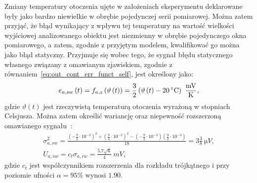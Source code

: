 Zmiany temperatury otoczenia ujęte w założeniach eksperymentu deklarowane były jako bardzo niewielkie w obrębie pojedynczej serii pomiarowej. Można zatem przyjąć, że błąd wynikający z wpływu tej temperatury na wartość wielkości wyjściowej analizowanego obiektu jest niezmienny w obrębie pojedynczego okna pomiarowego, a zatem, zgodnie z przyjętym modelem, kwalifikować go można jako błąd statyczny. Przyjmuje się wobec tego, że sygnał błędu statycznego własnego związany z omawianym zjawiskiem, zgodnie z równaniem~\eqref{eq:out_cont_err_funct_self}, jest określony jako:
\begin{equation}
e_{a,sw} \emb{t} = f_{a,z} \left( \vartheta \emb{t} \right) = \frac{3}{2} \left( \vartheta \emb{t} - \qty{20}{\degreeCelsius} \right)~\unit{\frac{mV}{K}} \label{eq:sym_parta_stat_err},
\end{equation}
gdzie $\vartheta(t)$ jest rzeczywistą temperaturą otoczenia wyrażoną w stopniach Celsjusza. Można zatem określić wariancję oraz niepewność rozszerzoną omawianego sygnału~\cite{jcgm_guide}:
\begin{gather}
\sigma_{a,sw}^{2} = \frac{\left( -\frac{9}{2} \cdot 10^{-3} \right)^{2} + \left( \frac{9}{2} \cdot 10^{-3} \right)^{2} - \left( -\frac{9}{2} \cdot 10^{-3} \right) \left( \frac{9}{2} \cdot 10^{-3} \right)}{18} = 3 \frac{3}{8}~\unit{\micro V} \label{eq:sym_parta_stat_var}, \\
U_{a,sw} = c_{t} \sigma_{a,rw} = \frac{5.7 \sqrt{6}}{4}~\unit{mV} \label{eq:sym_parta_stat_unc},
\end{gather}
gdzie $c_{t}$ jest współczynnikiem rozszerzenia dla rozkładu trójkątnego i przy poziomie ufności $\alpha = 95\%$ wynosi $1.90$.

